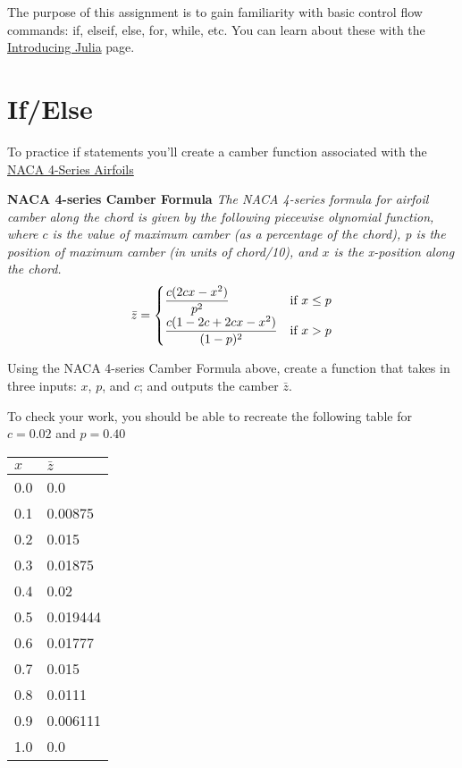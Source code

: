 \documentclass{article}%
\begin{document}
	
	The purpose of this assignment is to gain familiarity with basic control flow commands: if, elseif, else, for, while, etc. You can learn about these with the \href{https://en.wikibooks.org/wiki/Introducing_Julia/Controlling_the_flow}{Introducing Julia} page.
	
	\section*{If/Else}
	To practice if statements you'll create a camber function associated with the \href{https://en.wikipedia.org/wiki/NACA_airfoil}{NACA 4-Series Airfoils} 
	
	\bigskip
	
	\begin{tcolorbox}
		\textbf{
			NACA 4-series Camber Formula
		} 
		\textit{
			The NACA 4-series formula for airfoil camber along the chord is given by the following piecewise olynomial function, where $c$ is the value of maximum camber (as a percentage of the chord), p is the position of maximum camber (in units of chord/10), and $x$ is the x-position along the chord.
		}
		\begin{align*}
		\bar{z} = 
		\begin{cases}
		\qfrac{c(2cx-x^2)}{p^2} &\text{if  } x \leq p\\
		\qfrac{c(1-2c +2cx - x^2)}{(1-p)^2} &\text{if  } x > p
		\end{cases}
		\end{align*}
		
	\end{tcolorbox}
	
	\bigskip
	
	Using the NACA 4-series Camber Formula above, create a function that takes in three inputs: $x$, $p$, and $c$; and outputs the camber $\bar{z}$.
	
	To check your work, you should be able to recreate the following table for $c=0.02$ and $p=0.40$
	
	\renewcommand{\arraystretch}{1.2}
	\begin{tabular}{ l | l }
		$x$ & $\bar{z}$ \\
		\hline
		0.0 & 0.0\\
		0.1 & 0.00875\\
		0.2 & 0.015\\
		0.3 & 0.01875\\
		0.4 & 0.02\\
		0.5 & 0.019444\\
		0.6 & 0.01777\\
		0.7 & 0.015\\
		0.8 & 0.0111\\
		0.9 & 0.006111\\
		1.0 & 0.0\\
	\end{tabular}
	
\end{document}
